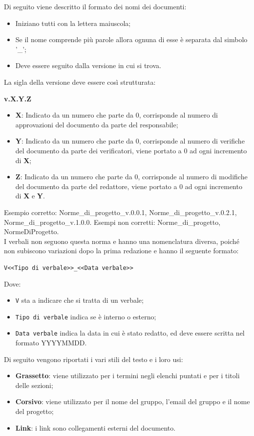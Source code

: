 Di seguito viene descritto il formato dei nomi dei documenti:
\begin{itemize}
\item Iniziano tutti con la lettera maiuscola;
\item Se il nome comprende più parole allora ognuna di esse è separata dal simbolo '\_';
\item Deve essere seguito dalla versione in cui si trova.
\end {itemize}
La sigla della versione deve essere così strutturata:
\begin{center}
    \large{\textbf{v.X.Y.Z}}
\end{center}
\begin{itemize}
\item \textbf{X}: Indicato da un numero che parte da 0, corrisponde al numero di approvazioni del documento da parte del responsabile;
\item \textbf{Y}: Indicato da un numero che parte da 0, corrisponde al numero di verifiche del documento da parte dei verificatori, viene portato a 0 ad ogni incremento di \textbf{X};
\item \textbf{Z}: Indicato da un numero che parte da 0, corrisponde al numero di modifiche del documento da parte del redattore, viene portato a 0 ad ogni incremento di \textbf{X} e \textbf{Y}.
\end {itemize}
Esempio corretto: Norme\_di\_progetto\_v.0.0.1, Norme\_di\_progetto\_v.0.2.1, Norme\_di\_progetto\_v.1.0.0.
Esempi non corretti: Norme\_di\_progetto, NormeDiProgetto.\\
I verbali non seguono questa norma e hanno una nomenclatura diversa, poiché non subiscono variazioni dopo la prima redazione e hanno il seguente formato: 
\begin{center}
	\verb|V<<Tipo di verbale>>_<<Data verbale>>|
\end{center}
Dove:
\begin{itemize}
	\item \verb|V| sta a indicare che si tratta di un verbale;
	\item \verb|Tipo di verbale| indica se è interno o esterno;
	\item \verb|Data verbale| indica la data in cui è stato redatto, ed deve essere scritta nel formato YYYYMMDD.
\end{itemize}

Di seguito vengono riportati i vari stili del testo e i loro usi:
\begin {itemize}
\item \textbf{Grassetto}: viene utilizzato per i termini negli elenchi puntati e per i titoli delle sezioni;
\item \textbf{Corsivo}: viene utilizzato per il nome del gruppo, l'email del gruppo e il nome del progetto;
\item \textbf{Link}: i link sono collegamenti esterni del documento.
\end {itemize}

